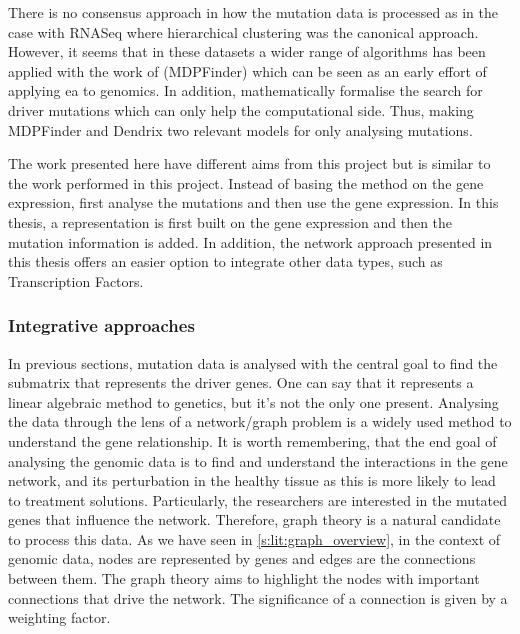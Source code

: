 There is no consensus approach in how the mutation data is processed as in the case with RNASeq where hierarchical clustering was the canonical approach. However, it seems that in these datasets a wider range of algorithms has been applied with the work of \citet{Zhao2012-wj} (MDPFinder) which can be seen as an early effort of applying \acrshort{ea} to genomics. In addition, \citet{Vandin2012-cf} mathematically formalise the search for driver mutations which can only help the computational side. Thus, making MDPFinder and Dendrix two relevant models for only analysing mutations. 

The work presented here have different aims from this project but \citet{Zhao2012-wj} is similar to the work performed in this project. Instead of basing the method on the gene expression, first analyse the mutations and then use the gene expression. In this thesis, a representation is first built on the gene expression and then the mutation information is added. In addition, the network approach presented in this thesis offers an easier option to integrate other data types, such as Transcription Factors.


\subsubsection{Integrative approaches} \label{s:lit:multi-view}

\vspace{3mm}
\vspace{3mm}

In previous sections, mutation data is analysed with the central goal to find the submatrix that represents the driver genes. One can say that it represents a linear algebraic method to genetics, but it's not the only one present. Analysing the data through the lens of a network/graph problem is a widely used method to understand the gene relationship. It is worth remembering, that the end goal of analysing the genomic data is to find and understand the interactions in the gene network, and its perturbation in the healthy tissue as this is more likely to lead to treatment solutions. Particularly, the researchers are interested in the mutated genes that influence the network. Therefore, graph theory is a natural candidate to process this data. As we have seen in \cref{s:lit:graph_overview}, in the context of genomic data, nodes are represented by genes and edges are the connections between them. The graph theory aims to highlight the nodes with important connections that drive the network. The significance of a connection is given by a weighting factor.


